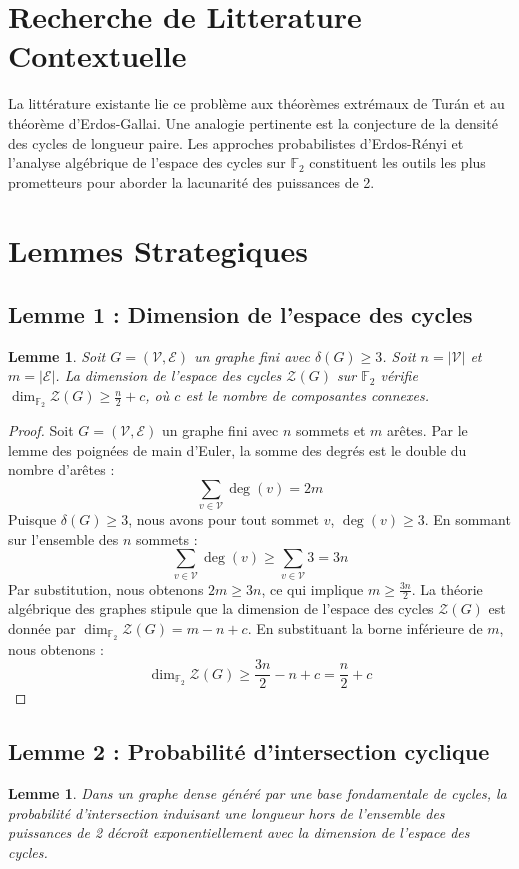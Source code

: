 \documentclass[11pt,a4paper]{article}
\newtheorem{lemma}[theorem]{Lemme}
\begin{document}
\section{Recherche de Litterature Contextuelle}
La littérature existante lie ce problème aux théorèmes extrémaux de Turán et au théorème d'Erdos-Gallai. Une analogie pertinente est la conjecture de la densité des cycles de longueur paire. Les approches probabilistes d'Erdos-Rényi et l'analyse algébrique de l'espace des cycles sur $\mathbb{F}_2$ constituent les outils les plus prometteurs pour aborder la lacunarité des puissances de 2.

\section{Lemmes Strategiques}

\subsection{Lemme 1 : Dimension de l'espace des cycles}
\begin{lemma}
Soit $G = (\mathcal{V}, \mathcal{E})$ un graphe fini avec $\delta(G) \ge 3$. Soit $n = |\mathcal{V}|$ et $m = |\mathcal{E}|$. La dimension de l'espace des cycles $\mathcal{Z}(G)$ sur $\mathbb{F}_2$ vérifie $\dim_{\mathbb{F}_2} \mathcal{Z}(G) \ge \frac{n}{2} + c$, où $c$ est le nombre de composantes connexes.
\end{lemma}

\begin{proof}
Soit $G = (\mathcal{V}, \mathcal{E})$ un graphe fini avec $n$ sommets et $m$ arêtes. Par le lemme des poignées de main d'Euler, la somme des degrés est le double du nombre d'arêtes :
\[ \sum_{v \in \mathcal{V}} \deg(v) = 2m \]
Puisque $\delta(G) \ge 3$, nous avons pour tout sommet $v$, $\deg(v) \ge 3$. En sommant sur l'ensemble des $n$ sommets :
\[ \sum_{v \in \mathcal{V}} \deg(v) \ge \sum_{v \in \mathcal{V}} 3 = 3n \]
Par substitution, nous obtenons $2m \ge 3n$, ce qui implique $m \ge \frac{3n}{2}$.
La théorie algébrique des graphes stipule que la dimension de l'espace des cycles $\mathcal{Z}(G)$ est donnée par $\dim_{\mathbb{F}_2} \mathcal{Z}(G) = m - n + c$.
En substituant la borne inférieure de $m$, nous obtenons :
\[ \dim_{\mathbb{F}_2} \mathcal{Z}(G) \ge \frac{3n}{2} - n + c = \frac{n}{2} + c \]
\end{proof}

\subsection{Lemme 2 : Probabilité d'intersection cyclique}
\begin{lemma}
Dans un graphe dense généré par une base fondamentale de cycles, la probabilité d'intersection induisant une longueur hors de l'ensemble des puissances de 2 décroît exponentiellement avec la dimension de l'espace des cycles.
\end{lemma}
\end{document}
